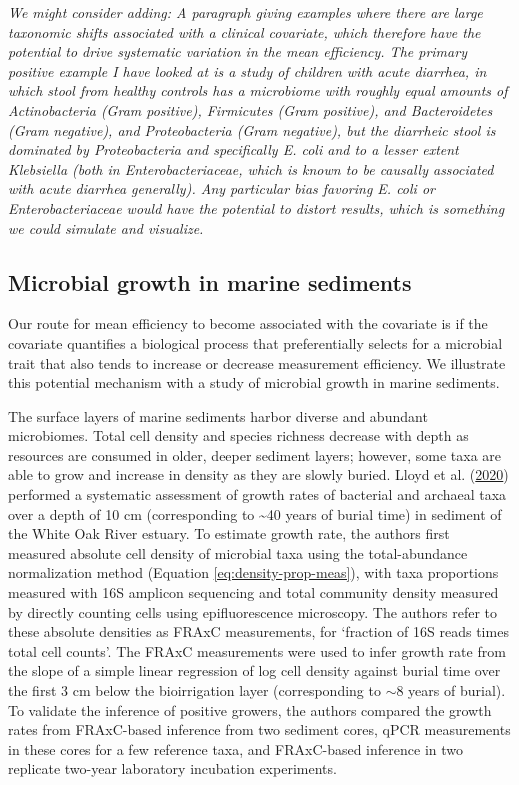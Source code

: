 \documentclass[
]{article}
\begin{document}
\emph{We might consider adding: A paragraph giving examples where there are large taxonomic shifts associated with a clinical covariate, which therefore have the potential to drive systematic variation in the mean efficiency.
The primary positive example I have looked at is a study of children with acute diarrhea, in which stool from healthy controls has a microbiome with roughly equal amounts of Actinobacteria (Gram positive), Firmicutes (Gram positive), and Bacteroidetes (Gram negative), and Proteobacteria (Gram negative), but the diarrheic stool is dominated by Proteobacteria and specifically E. coli and to a lesser extent Klebsiella (both in Enterobacteriaceae, which is known to be causally associated with acute diarrhea generally).
Any particular bias favoring E. coli or Enterobacteriaceae would have the potential to distort results, which is something we could simulate and visualize.}

\hypertarget{microbial-growth-in-marine-sediments}{%
\subsection{Microbial growth in marine sediments}\label{microbial-growth-in-marine-sediments}}

Our route for mean efficiency to become associated with the covariate is if the covariate quantifies a biological process that preferentially selects for a microbial trait that also tends to increase or decrease measurement efficiency.
We illustrate this potential mechanism with a study of microbial growth in marine sediments.

The surface layers of marine sediments harbor diverse and abundant microbiomes. Total cell density and species richness decrease with depth as resources are consumed in older, deeper sediment layers; however, some taxa are able to grow and increase in density as they are slowly buried.
Lloyd et al. (\protect\hyperlink{ref-lloyd2020evid}{2020}) performed a systematic assessment of growth rates of bacterial and archaeal taxa over a depth of 10 cm (corresponding to \textasciitilde40 years of burial time) in sediment of the White Oak River estuary.
To estimate growth rate, the authors first measured absolute cell density of microbial taxa using the total-abundance normalization method (Equation \eqref{eq:density-prop-meas}), with taxa proportions measured with 16S amplicon sequencing and total community density measured by directly counting cells using epifluorescence microscopy.
The authors refer to these absolute densities as FRAxC measurements, for `fraction of 16S reads times total cell counts'.
The FRAxC measurements were used to infer growth rate from the slope of a simple linear regression of log cell density against burial time over the first 3 cm below the bioirrigation layer (corresponding to \(\sim 8\) years of burial).
To validate the inference of positive growers, the authors compared the growth rates from FRAxC-based inference from two sediment cores, qPCR measurements in these cores for a few reference taxa, and FRAxC-based inference in two replicate two-year laboratory incubation experiments.
\end{document}
